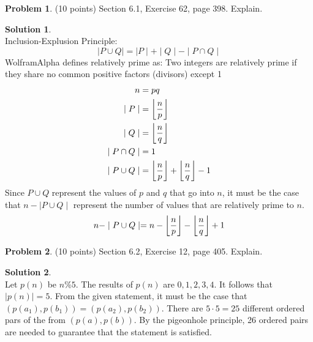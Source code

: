 \documentclass{article}
\DeclarePairedDelimiter\floor{\lfloor}{\rfloor}
\theoremstyle{definition}
\newtheorem{problem}{Problem}
\newtheorem*{solution}{Solution}
\begin{document}
\begin{problem} (10 points) 
Section 6.1, Exercise 62, page 398.  Explain.
\end{problem}
\begin{solution}\ \\
Inclusion-Explusion Principle:
$$\mid P \cup Q \mid = \mid P \mid + \mid Q \mid - \mid P \cap Q \mid$$
WolframAlpha defines relatively prime as: Two integers are relatively prime if they share no common positive factors (divisors) except 1
\begin{align*}
  n &= pq\\
  \mid P \mid &= \floor*{\dfrac{n}{p}} \\
  \mid Q \mid &= \floor*{\dfrac{n}{q}} \\
  \mid P \cap Q \mid &= 1 \\
  \mid P \cup Q \mid &= \floor*{\dfrac{n}{p}} + \floor*{\dfrac{n}{q}} - 1
\end{align*}
Since $P \cup Q$ represent the values of $p$ and $q$ that go into $n$, it must be the case that $n - \mid P \cup Q \mid$ represent the number of values that are relatively prime to $n$.
$$ n - \mid P \cup Q \mid = n - \floor*{\dfrac{n}{p}} - \floor*{\dfrac{n}{q}} + 1$$
\end{solution}

\begin{problem} (10 points) 
Section 6.2, Exercise 12, page 405.  Explain.
\end{problem}
\begin{solution} \ \\
Let $p(n)$ be $n \% 5$. The results of $p(n)$ are $0,1,2,3,4$. It follows that $\mid p(n) \mid = 5$. From the given statement, it must be the case that $(p(a_1),p(b_1)) = (p(a_2),p(b_2))$. There are $5\cdot 5 = 25$ different ordered pars of the from $(p(a),p(b))$. By the pigeonhole principle, 26 ordered pairs are needed to guarantee that the statement is satisfied.
\end{solution}
\end{document}
